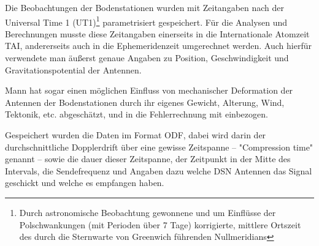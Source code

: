 Die Beobachtungen der Bodenstationen wurden mit Zeitangaben nach der Universal Time 1 (UT1)\footnote{Durch astronomische
Beobachtung gewonnene und um Einflüsse der Polschwankungen (mit Perioden über 7 Tage) korrigierte, mittlere Ortszeit des
durch die Sternwarte von Greenwich führenden Nullmeridians} parametrisiert gespeichert. Für die Analysen und
Berechnungen musste diese Zeitangaben einerseits in die Internationale Atomzeit TAI, andererseits auch in die
Ephemeridenzeit umgerechnet werden. Auch hierfür verwendete man äußerst genaue Angaben zu Position, Geschwindigkeit und
Gravitationspotential der Antennen.\cite{Dittus2006}

Mann hat sogar einen möglichen Einfluss von mechanischer Deformation der Antennen der Bodenstationen durch ihr eigenes Gewicht,
Alterung, Wind, Tektonik, etc. abgeschätzt, und in die Fehlerrechnung mit einbezogen.\cite{Dittus2006} %


Gespeichert wurden die Daten im Format ODF, dabei wird darin der durchschnittliche Dopplerdrift über eine gewisse Zeitspanne
– "Compression time" genannt – sowie die dauer dieser Zeitspanne, der Zeitpunkt in der Mitte des Intervals, die Sendefrequenz und
Angaben dazu welche DSN Antennen das Signal geschickt und welche es empfangen haben.\cite{Levey2008} 	%


